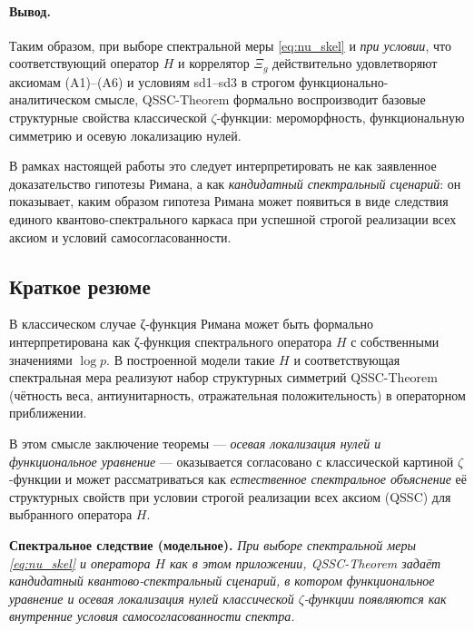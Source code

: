 \documentclass{article}
\numberwithin{equation}{section}
\theoremstyle{plain}
\theoremstyle{definition}
\theoremstyle{remark}
\begin{document}
\paragraph{Вывод.}
Таким образом, при выборе спектральной меры \eqref{eq:nu_skel} и
\emph{при условии}, что соответствующий оператор $H$ и коррелятор $\Xi_g$
действительно удовлетворяют аксиомам (A1)–(A6) и условиям sd1–sd3
в строгом функционально-аналитическом смысле, QSSC-Theorem формально
воспроизводит базовые структурные свойства классической $\zeta$-функции:
мероморфность, функциональную симметрию и осевую локализацию нулей.

В рамках настоящей работы это следует интерпретировать не как
заявленное доказательство гипотезы Римана, а как \emph{кандидатный
спектральный сценарий}: он показывает, каким образом гипотеза Римана
может появиться в виде следствия единого квантово-спектрального каркаса
при успешной строгой реализации всех аксиом и условий самосогласованности.

\subsection*{Краткое резюме}
\label{subsec:summaryA}

В классическом случае ζ-функция Римана может быть формально
интерпретирована как ζ-функция спектрального оператора $H$ с
собственными значениями $\log p$. В построенной модели такие $H$ и
соответствующая спектральная мера реализуют набор структурных симметрий
QSSC-Theorem (чётность веса, антиунитарность, отражательная
положительность) в операторном приближении.

В этом смысле заключение теоремы — 
\emph{осевая локализация нулей и функциональное уравнение} — 
оказывается согласовано с классической картиной $\zeta$-функции и
может рассматриваться как \emph{естественное спектральное объяснение}
её структурных свойств при условии строгой реализации всех аксиом
(QSSC) для выбранного оператора $H$.

\begin{center}
\textbf{Спектральное следствие (модельное).}
\quad
\textit{
При выборе спектральной меры \eqref{eq:nu_skel} и оператора $H$
как в этом приложении, QSSC-Theorem задаёт кандидатный
квантово-спектральный сценарий, в котором
функциональное уравнение и осевая локализация нулей
классической $\zeta$-функции появляются как внутренние
условия самосогласованности спектра.
}
\end{center}
\end{document}
